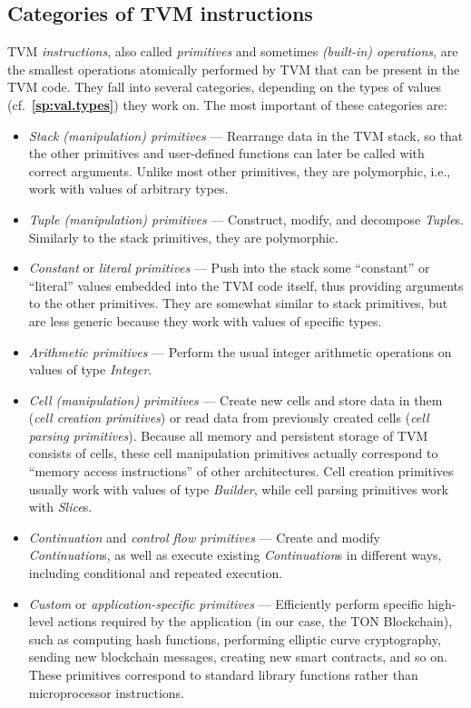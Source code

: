 \documentclass[12pt,oneside]{article}
\def\refpoint#1{{\rm\textbf{\ref{#1}}}}
\let\ptref=\refpoint
\def\mysubsection#1{

    \subsection{#1}\fancyhead[C]{\small{\textsc{\textrm{\thesubsection.} #1}}}}
\begin{document}
    \mysubsection{Categories of TVM instructions}
    TVM {\em instructions}, also called {\em primitives\/} and sometimes {\em (built-in) operations}, are the smallest operations atomically performed by TVM that can be present in the TVM code. They fall into several categories, depending on the types of values (cf.~\ptref{sp:val.types}) they work on. The most important of these categories are:
    \begin{itemize}
        \item {\em Stack (manipulation) primitives\/} --- Rearrange data in the TVM stack, so that the other primitives and user-defined functions can later be called with correct arguments. Unlike most other primitives, they are polymorphic, i.e., work with values of arbitrary types.
        \item {\em Tuple (manipulation) primitives\/} --- Construct, modify, and decompose {\em Tuple\/}s. Similarly to the stack primitives, they are polymorphic.
        \item {\em Constant\/} or {\em literal primitives\/} --- Push into the stack some ``constant'' or ``literal'' values embedded into the TVM code itself, thus providing arguments to the other primitives. They are somewhat similar to stack primitives, but are less generic because they work with values of specific types.
        \item {\em Arithmetic primitives\/} --- Perform the usual integer arithmetic operations on values of type {\em Integer}.
        \item {\em Cell (manipulation) primitives\/} --- Create new cells and store data in them ({\em cell creation primitives}) or read data from previously created cells ({\em cell parsing primitives}). Because all memory and persistent storage of TVM consists of cells, these cell manipulation primitives actually correspond to ``memory access instructions'' of other architectures. Cell creation primitives usually work with values of type {\em Builder}, while cell parsing primitives work with {\em Slice\/}s.
        \item {\em Continuation\/} and {\em control flow primitives\/} --- Create and modify {\em Continuation\/}s, as well as execute existing {\em Continuation\/}s in different ways, including conditional and repeated execution.
        \item {\em Custom\/} or {\em application-specific primitives\/} --- Efficiently perform specific high-level actions required by the application (in our case, the TON Blockchain), such as computing hash functions, performing elliptic curve cryptography, sending new blockchain messages, creating new smart contracts, and so on. These primitives correspond to standard library functions rather than microprocessor instructions.
    \end{itemize}
\end{document}
